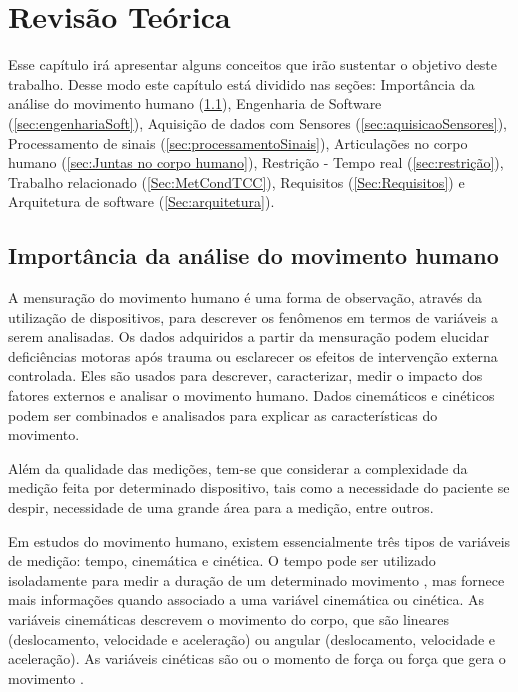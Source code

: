 
\chapter[Revisão Teórica]{Revisão Teórica}
  Esse capítulo irá apresentar alguns conceitos que irão sustentar o objetivo deste trabalho.
Desse modo este capítulo está dividido nas seções: Importância da análise do movimento humano (\ref{sec:importancia}),
Engenharia de Software (\ref{sec:engenhariaSoft}), Aquisição de dados com Sensores (\ref{sec:aquisicaoSensores}),
Processamento de sinais (\ref{sec:processamentoSinais}), Articulações no corpo humano (\ref{sec:Juntas no corpo humano}), Restrição - Tempo real (\ref{sec:restrição}),
Trabalho relacionado (\ref{Sec:MetCondTCC}), Requisitos (\ref{Sec:Requisitos}) e Arquitetura de software (\ref{Sec:arquitetura}).

\section{Importância da análise do movimento humano}\label{sec:importancia}

A mensuração do movimento humano é uma forma de observação, através da utilização
de dispositivos, para descrever os fenômenos em termos de variáveis a serem analisadas.
Os dados adquiridos a partir da mensuração podem elucidar deficiências
motoras após trauma ou esclarecer os efeitos de intervenção externa controlada.
Eles são usados para descrever, caracterizar, medir o impacto dos
fatores externos e analisar o movimento humano. Dados cinemáticos e cinéticos podem ser combinados
e analisados para explicar as características do movimento.

Além da qualidade das medições, tem-se que considerar a complexidade da medição
feita por determinado dispositivo, tais como a necessidade do paciente se despir,
necessidade de uma grande área para a medição, entre outros.

Em estudos do movimento humano, existem essencialmente três tipos de variáveis de medição: tempo,
cinemática e cinética. O tempo pode ser utilizado isoladamente para medir a duração de um determinado movimento
, mas fornece mais informações quando associado a uma variável cinemática ou cinética.
As variáveis cinemáticas descrevem o movimento do corpo, que são lineares (deslocamento,
velocidade e aceleração) ou angular (deslocamento, velocidade e aceleração).
 As variáveis cinéticas são ou o momento de força ou força que gera o movimento \cite{roberto}.


